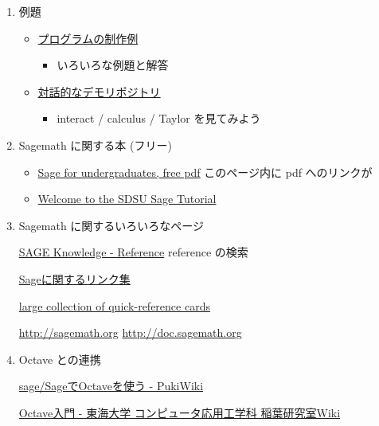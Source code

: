 \documentclass[dvipdfmx,11pat]{jarticle}
\begin{document}
\begin{enumerate}
\item 例題
\label{sec:org5a2e009}

\begin{itemize}
\item \href{http://doc.sagemath.org/html/en/constructions/index.html}{プログラムの制作例}
\begin{itemize}
\item いろいろな例題と解答
\end{itemize}

\item \href{https://wiki.sagemath.org/interact}{対話的なデモリポジトリ} 
\begin{itemize}
\item interact / calculus / Taylor  を見てみよう
\end{itemize}
\end{itemize}

\item Sagemath に関する本 (フリー)
\label{sec:org6564e08}

\begin{itemize}
\item \href{http://www.gregorybard.com/Sage.html}{Sage for undergraduates, free pdf}   このページ内に pdf へのリンクが

\item \href{http://mosullivan.sdsu.edu/Teaching/sdsu-sage-tutorial/index.html}{Welcome to the SDSU Sage Tutorial}
\end{itemize}

\item Sagemath に関するいろいろなページ
\label{sec:orgd41b4fc}

\href{http://sk.sagepub.com/reference}{SAGE Knowledge - Reference} reference の検索

\href{https://qiita.com/HirofumiYashima/items/6bb5770961a3b7d33118}{Sageに関するリンク集}

\href{http://wiki.sagemath.org/quickref}{large collection of quick-reference cards} 

\url{http://sagemath.org} \url{http://doc.sagemath.org} 

\item Octave との連携
\label{sec:org0ac7f7c}

\href{http://www.pwv.co.jp/\%7Etake/TakeWiki/index.php?sage\%2FSage\%E3\%81\%A7Octave\%E3\%82\%92\%E4\%BD\%BF\%E3\%81\%86}{sage/SageでOctaveを使う - PukiWiki} 

\href{http://www.inaba-lab.org/wiki/index.php/Octave\%E5\%85\%A5\%E9\%96\%80}{Octave入門 - 東海大学 コンピュータ応用工学科 稲葉研究室Wiki}


\end{enumerate}
\end{document}
